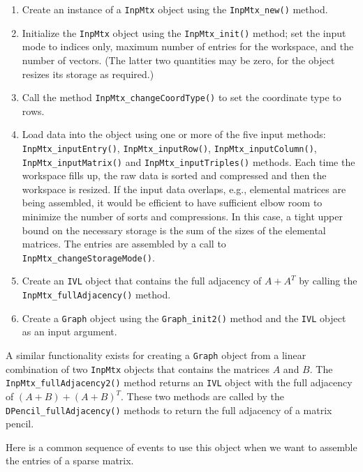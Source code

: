 \begin{enumerate}
\item
Create an instance of a {\tt InpMtx} object using
the {\tt InpMtx\_new()} method.
\item
Initialize the {\tt InpMtx} object using the {\tt InpMtx\_init()} 
method; set the input mode to indices only,
maximum number of entries for the workspace, and the number of
vectors. (The latter two quantities may be zero, for the object
resizes its storage as required.)
\item
Call the method {\tt InpMtx\_changeCoordType()}
to set the coordinate type to rows.
\item
Load data into the object using one or more of the
five input methods:
{\tt InpMtx\_inputEntry()},
{\tt InpMtx\_inputRow()}, 
{\tt InpMtx\_inputColumn()},
{\tt InpMtx\_inputMatrix()} and
{\tt InpMtx\_inputTriples()} methods.
Each time the workspace fills up, the raw data is sorted and
compressed and then the workspace is resized.
If the input data overlaps, e.g., elemental matrices are being
assembled, it would be efficient to have sufficient elbow room
to minimize the number of sorts and compressions.
In this case, a tight upper bound on the necessary storage is the
sum of the sizes of the elemental matrices.
The entries are assembled 
by a call to {\tt InpMtx\_changeStorageMode()}.
\item
Create an {\tt IVL} object that contains the full adjacency of
$A + A^T$ by calling the {\tt InpMtx\_fullAdjacency()} method.
\item
Create a {\tt Graph} object using the {\tt Graph\_init2()} method
and the {\tt IVL} object as an input argument.
\end{enumerate}
A similar functionality exists for creating a {\tt Graph} object
from a linear combination of two {\tt InpMtx} objects that
contains the matrices $A$ and $B$.
The {\tt InpMtx\_fullAdjacency2()} method returns an {\tt IVL}
object with the full adjacency of $(A+B) + (A+B)^T$.
These two methods are called by the {\tt DPencil\_fullAdjacency()}
methods to return the full adjacency of a matrix pencil.
\par
Here is a common sequence of events to use this object when we want
to assemble the entries of a sparse matrix.
